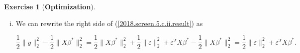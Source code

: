 \documentclass{article}
\theoremstyle{definition}
\newtheorem{exercise}{Exercise}
\theoremstyle{definition}
\theoremstyle{definition}
\theoremstyle{definition}
\theoremstyle{definition}
\renewcommand{\epsilon}{\varepsilon}
\renewcommand{\epsilon}{\varepsilon}
\begin{document}
\begin{exercise}[\textbf{Optimization}]
\begin{enumerate}[(a)]
\begin{enumerate}[(i)]
%
%
%
%
%
%
%
%
%
%

\item 

%
%
%

We can rewrite the right side of (\ref{2018.screen.5.c.ii.result}) as 

\begin{equation}\label{2018.screen.5.c.ii.result.rewritten}
\frac{1}{2} \lVert y \rVert_2^2 - \frac{1}{2} \lVert X \beta^* \rVert_2^2 = \frac{1}{2} \lVert X \beta^* \rVert_2^2 + \frac{1}{2} \lVert \epsilon \rVert_2^2 + \epsilon^T X \beta^* - \frac{1}{2} \lVert X \beta^* \rVert_2^2  =  \frac{1}{2} \lVert \epsilon \rVert_2^2 + \epsilon^T X \beta^*. 
\end{equation}


\end{enumerate}
\end{enumerate}
\end{exercise}
\end{document}
